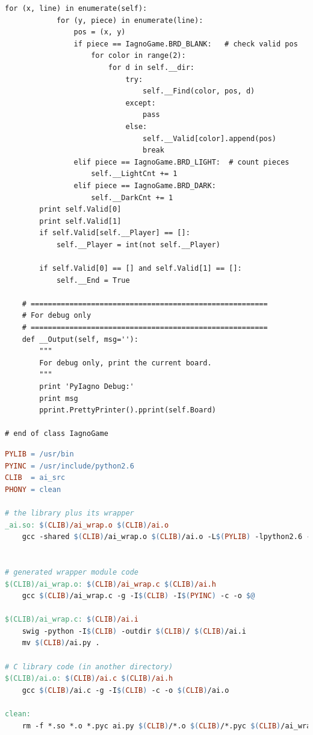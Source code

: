 \documentclass[oneside,a4paper]{article}
\begin{document}
\begin{lstlisting}[caption={game.py}]
        for (x, line) in enumerate(self):
            for (y, piece) in enumerate(line):
                pos = (x, y)
                if piece == IagnoGame.BRD_BLANK:   # check valid pos
                    for color in range(2):
                        for d in self.__dir:
                            try:
                                self.__Find(color, pos, d)
                            except:
                                pass
                            else:
                                self.__Valid[color].append(pos)
                                break
                elif piece == IagnoGame.BRD_LIGHT:  # count pieces
                    self.__LightCnt += 1
                elif piece == IagnoGame.BRD_DARK:
                    self.__DarkCnt += 1
        print self.Valid[0]
        print self.Valid[1]
        if self.Valid[self.__Player] == []:
            self.__Player = int(not self.__Player)
                
        if self.Valid[0] == [] and self.Valid[1] == []:
            self.__End = True

    # =======================================================
    # For debug only
    # =======================================================
    def __Output(self, msg=''):
        """
        For debug only, print the current board.
        """
        print 'PyIagno Debug:'
        print msg
        pprint.PrettyPrinter().pprint(self.Board)

# end of class IagnoGame
\end{lstlisting}

\begin{lstlisting}[language=make, caption=Makefile]
PYLIB = /usr/bin
PYINC = /usr/include/python2.6
CLIB  = ai_src
PHONY = clean

# the library plus its wrapper
_ai.so: $(CLIB)/ai_wrap.o $(CLIB)/ai.o
	gcc -shared $(CLIB)/ai_wrap.o $(CLIB)/ai.o -L$(PYLIB) -lpython2.6 -o $@


# generated wrapper module code
$(CLIB)/ai_wrap.o: $(CLIB)/ai_wrap.c $(CLIB)/ai.h
	gcc $(CLIB)/ai_wrap.c -g -I$(CLIB) -I$(PYINC) -c -o $@

$(CLIB)/ai_wrap.c: $(CLIB)/ai.i
	swig -python -I$(CLIB) -outdir $(CLIB)/ $(CLIB)/ai.i
	mv $(CLIB)/ai.py .

# C library code (in another directory)
$(CLIB)/ai.o: $(CLIB)/ai.c $(CLIB)/ai.h
	gcc $(CLIB)/ai.c -g -I$(CLIB) -c -o $(CLIB)/ai.o

clean:
	rm -f *.so *.o *.pyc ai.py $(CLIB)/*.o $(CLIB)/*.pyc $(CLIB)/ai_wrap.c 
\end{lstlisting}
\end{document}

